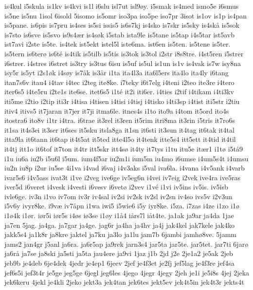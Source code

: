 is4kul
i5skula
is1kv
is4kvi
is1l
i6slu
isl7ut
isl9^^f8y.
i5smak
is4med
ismo5e
i6smus
is5ne
is5nu
1isol
6isold
5isomo
is5omr
iso3pa
iso5pe
iso7pr
3isot
is1ov
is1p
is4pan
is5pane.
is6pis
is7pru
is4ses
is5si
issis5
is6s7kj
is4sko
is7skr
is5sky
is4sk^^e5
is5sok
is7sto
is6sve
is5svo
is9s4^^e6r
is4s^^f8k
i5stab
ista9le
is5tane
is5tap
i4s5tar
ist5avb
ist7avi
i2ste
is5te.
is4tek
ist5ekt
istel5l
iste6ma.
ist6en
is5ten.
is5tene
is5ter.
is5tern
is6ter^^f8
is6t^^e9
is4tik
is5tilb
is5tis
is3tok
is3tol
i2str
i8s8tre.
i4st5ren
i5strer
i6strer.
i4stres
i6stret
is3try
is3tus
6isu
is5uf
is5ul
is1un
is1v
is4vak
is7w
isy8na
isy5r
is5yt
i2s1^^f8k
i4s^^f8y
is7^^e5k
is3^^e5r
i1ta
ita4l3a
ita6l5ers
ita4lo
ita4ly
i6tang
itan7s6v
itau4
i4tav
i4tec
i2teg
ite8ke.
i7teky
i6t7elg
i4teni
i2teo
ite3re
i4tero
iter6s5
i4te5ru
i2te1s
ite6se.
itet6s5
i1t^^e9
it2i
iti6er.
i4ties
i2tif
i4tikam
i4ti3kv
iti5me
i2tio
i2tip
iti3r
i4tisa
i4tisen
i4tisi
i4tisj
i4tisko
i4ti3sp
i4tist
iti5str
i2tiu
itiv4
itivs5
it7jaran
it7jer
it7ji
itma6le.
itnes4s
i1to
ito9a
i4tom
it5ord
ito4s
itostra6
ito8v
i1tr
i4tra.
i6trae
it3rel
it3ren
it5rim
itri8ma
it3rin
i5tris
it7ro6s
it1sa
it4s3ei
it3ser
it6ses
it5sku
itsla8ga
it1sn
it6sti
it3sun
it4tag
it6tak
it4tal
itta9la
it6tann
it6tap
it4t5at
it5ted
itte4l5o
it4tenk
itte5s4
itt5ett
it4tid
it4til
it4tj
itt1o
it6tof
it7ton
it4tr
itt5skr
itt4s^^f8
it4ty
it7tys
i1tu
itu5e
it^^e6r1
i1t^^f8
i5t^^e59
i1u
iu6a
iu2b
i5u6l
i5um.
ium4f5ar
iu2m1i
ium5m
iu4mo
i6umse
i4um5s4t
i4umsu
iu2n
iu8p
i2ur
iu5se
4i1va
i4vad
i6vaj
i4v3aks
i5val
iva6la.
i4vana
i4v5ank
i4varb
ivar5s6
i4v5ass
ivat3t
i1ve
i2veg
ive6ge
iv5eg6n
i4vei
iv7eig
i2vek
ive4ra
ive5ras
iver5d
i6veret
i4vesk
i4vesti
i6vesv
i6vet^^f8
i2vev
i1v^^e9
i1vi
iv5ins
iv5is.
iv5isb
ivle6ge.
iv3n
i1vo
iv7om
iv3r
iv4sal
iv2si
iv2sk
iv2sl
iv2sn
iv4so
ivs5v
i2v3un
i5v6y
ivyr8ke.
i9v^^e6
iv7^^e5pn
i1wa
iwi5
i5wie6
i5y
iyr8ke.
i5za.
i7zas
i4ze
i1zo
i1^^f8
i1^^f84k
i1^^f8r.
i^^f8r5i
i^^f8r5s
i4^^f8s
i^^f83se
i1^^f8y
i1^^e54
i^^e5rs7l
i^^e5t4te.
ja1ak
ja9ar
ja4da
1jae
ja7en
5jag.
ja4ga.
ja7gar
ja4ge.
jag6r
ja4ha
ja4hv
ja4j
jak4kel
jak7kele
jak4ko
jakk5s4
ja1k8r
ja8kre
jaktel
ja7ku
ja3lo
ja1lu
jam7b
6jambi
jamh^^f88ve.
5jamm
jams2
jan4gr
j5anl
ja6ra.
ja6r5ap
ja9rek
jarn3s4
jar5ta
jar5te.
jar5tet.
jar7ti
6jar^^f8
ja6r^^e5
ja7se
ja8ski
ja5sti
ja5ta
jau4ere
ja9vi
1jaz
j1b
2jd
j2e
2je1a2
je5ak
2jeb
jeb9b
je4deb
6je4dek
4jedr
je4ep1
6jeev
2jef
je4f3et
je2fj
jef5lag
je4f3re
jef4sa
jef6s5i
jef3t4r
je5ge
jeg5ge
6jegl
jeg6les
4jego
4jegr
4jegy
2jeh
je1i
je5i8s
4jej
2jeka
jek6keru
4jekl
je4kli
2jeko
jekt3a
jek4tan
jek6tes
jekt5ev
jek4t5in
jek4t3r
jekts4t

